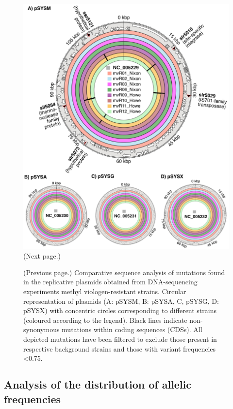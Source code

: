 \documentclass[12pt]{article}
\begin{document}
\begin{figure}[H]
    \centering
    \includegraphics[width=\hsize]{../Figures/WGS/large_plasmid_analysis.png}
    \caption{(Next page.)}
    \label{fig:plasmidanalysis}
\end{figure}
\addtocounter{figure}{-1}
\begin{figure} [t!]
  \caption{(Previous page.) Comparative sequence analysis of mutations found in the replicative plasmids obtained from DNA-sequencing experiments methyl viologen-resistant strains. Circular representation of plasmids (A: pSYSM, B: pSYSA, C, pSYSG, D: pSYSX) with concentric circles corresponding to different strains (coloured according to the legend). Black lines indicate non-synonymous mutations within coding sequences (CDSs). All depicted mutations have been filtered to exclude those present in respective background strains and those with variant frequencies <0.75.}%
\end{figure}

\subsection{Analysis of the distribution of allelic frequencies}
\end{document}
